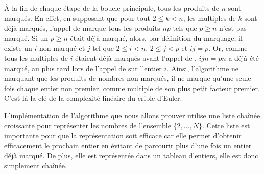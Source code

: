 \documentclass[a4paper]{easychair}
\begin{document}
À la fin de chaque étape de la boucle principale, tous les produits de $n$ sont
marqués. En effet, en supposant que pour tout $2 \leq k < n$, les multiples de $k$
sont déjà marqués, l'appel de  marque tous les produits
$np$ tels que $p \geq n$ n'est pas marqué. Si un $p \geq n$ était déjà marqué,
alors, par définition du marquage, il existe un $i$ non marqué et $j$ tel que
$2 \leq i < n$, $2 \leq j < p$ et $ij = p$. Or, comme tous les multiples de $i$
étaient déjà marqués avant l'appel de , $ijn = pn$
a déjà été marqué, au plus tard lors de l'appel de  sur
l'entier $i$.
Ainsi, l'algorithme ne marquant que les produits de nombres non marqués, il ne
marque qu'une seule fois chaque entier non premier, comme multiple de
son plus petit facteur premier. C'est là la clé de la complexité
linéaire du crible d'Euler.


L'implémentation de l'algorithme que nous allons prouver utilise une liste
chaînée croissante pour représenter les nombres de l'ensemble $\{2,...,N\}$.
Cette liste est importante pour que la représentation soit efficace car elle
permet d'obtenir efficacement le prochain entier
en évitant de parcourir plus d'une fois un entier déjà marqué.
De plus, elle est représentée dans un tableau d'entiers, elle est donc
simplement chaînée.
\end{document}
